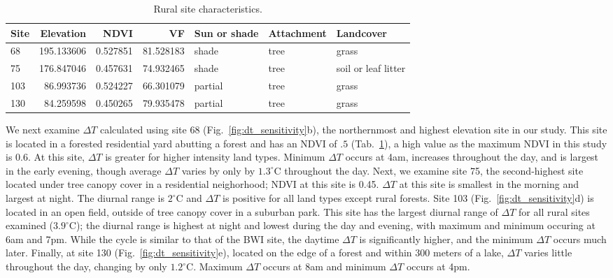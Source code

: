 \documentclass[draft,linenumbers]{agujournal}
\begin{document}
\begin{table}
\begin{tabular}{lrrrlll}
\toprule
Site &   Elevation &      NDVI &         VF &  Sun or shade & Attachment & Landcover \\
\midrule
68  &  195.133606 &  0.527851 &  81.528183 &      shade &       tree &          grass  \\
75  &  176.847046 &  0.457631 &  74.932465 &      shade &       tree &           soil or leaf litter\\
103 &   86.993736 &  0.524227 &  66.301079 &    partial &       tree &          grass\\
130 &   84.259598 &  0.450265 &  79.935478 &    partial &       tree &          grass \\
\bottomrule
\end{tabular}
\caption{Rural site characteristics.}
\label{tab:rural_ibuttons}
\end{table}

We next examine $\Delta T$ calculated using site 68 (Fig.~\ref{fig:dt_sensitivity}b), the northernmost and highest elevation site in our study. This site is located in a forested residential yard abutting a forest and has an NDVI of $.5$ (Tab.~\ref{tab:rural_ibuttons}), a high value as the maximum NDVI in this study is $0.6$. At this site, $\Delta T$ is greater for higher intensity land types. Minimum $\Delta T$ occurs at 4am, increases throughout the day, and is largest in the early evening, though average $\Delta T$ varies by only by $1.3^\circ$C throughout the day.
Next, we examine site 75, the second-highest site located under tree canopy cover in a residential neighorhood; NDVI at this site is 0.45. $\Delta T$ at this site is smallest in the morning and largest at night. The diurnal range is $2^\circ$C and $\Delta T$ is positive for all land types except rural forests. 
Site 103 (Fig.~\ref{fig:dt_sensitivity}d) is located in an open field, outside of tree canopy cover in a suburban park.  
This site has the largest diurnal range of $\Delta T$ for all rural sites examined ($3.9^\circ$C); the diurnal range is highest at night and lowest during the day and evening, with maximum and minimum occuring at 6am and 7pm.
While the cycle is similar to that of the BWI site, the daytime $\Delta T$ is significantly higher, and the minimum $\Delta T$ occurs much later. 
Finally, at site 130  (Fig.~\ref{fig:dt_sensitivity}e), located on the edge of a forest and within 300 meters of a lake, $\Delta T$ varies little throughout the day, changing by only $1.2^\circ$C. Maximum $\Delta T$ occurs at 8am and minimum $\Delta T$ occurs at 4pm. 
\end{document}
